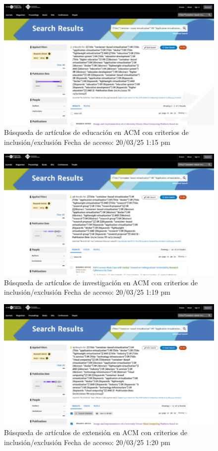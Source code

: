\begin{figure}[H]
    \centering
    \includegraphics[width=\textwidth,keepaspectratio]{apendices/BD/criterios/ACM-ed.png}
    \caption{Búsqueda de artículos de educación en ACM con criterios de inclusión/exclusión
    Fecha de acceso: 20/03/25 1:15 pm
    }\label{fig:busqueda16}
\end{figure}
\FloatBarrier\begin{figure}[H]
    \centering
    \includegraphics[width=\textwidth,keepaspectratio]{apendices/BD/criterios/ACM-inv.png}
    \caption{Búsqueda de artículos de investigación en ACM con criterios de inclusión/exclusión
    Fecha de acceso: 20/03/25 1:19 pm
    }\label{fig:busqueda17}
\end{figure}
\FloatBarrier\begin{figure}[H]
    \centering
    \includegraphics[width=\textwidth,keepaspectratio]{apendices/BD/criterios/ACM-ind.png}
    \caption{Búsqueda de artículos de extensión en ACM con criterios de inclusión/exclusión
    Fecha de acceso: 20/03/25 1:20 pm
    }\label{fig:busqueda18}
\end{figure}
